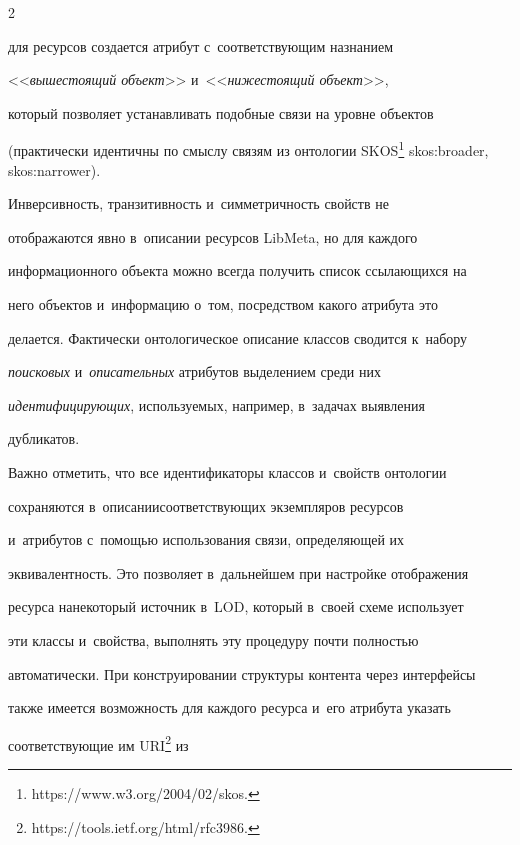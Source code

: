 \begin{multicols}{2}
\begin{itemize}
для ресурсов создается атрибут с~соответствующим назнанием 

<<\textit{вышестоящий объект}>> и~<<\textit{нижестоящий объект}>>, 

кото\-рый позволяет устанавливать подобные связи на уровне объектов 

(практически идентичны по смыслу связям из онтологии SKOS\footnote{{\sf  

https://www.w3.org/2004/02/skos.}} skos:broader, skos:narrower).

\end{itemize}



    Инверсивность, транзитивность и~симметричность свойств не 

отображаются явно в~описании ресурсов LibMeta, но для каждого 

информационного объекта можно всегда получить список ссылающихся на 

него объектов и~информацию о~том, посредством какого атрибута это 

делается. Фактически онтологическое описание классов сводится к~набору 

\textit{поисковых} и~\textit{описательных} атрибутов выделением среди них 

\textit{идентифицирующих}, используемых, например, в~задачах выявления 

дубликатов.

    

    Важно отметить, что все идентификаторы классов и~свойств онтологии 

сохраняются в~описании\linebreak соответствующих экземпляров ресурсов 

и~атрибутов с~помощью использования связи, опре\-де\-ля\-ющей их 

эквивалентность. Это позволяет в~дальнейшем при настройке отображения 

ресурса на\linebreak некоторый источник в~LOD, который в~своей схеме использует 

эти классы и~свойства, выполнять эту процедуру почти полностью 

автоматически. При конструировании структуры контента через интерфейсы 

также имеется возможность для каждого ресурса и~его атрибута указать 

соответствующие им URI\footnote[2]{{\sf https://tools.ietf.org/html/rfc3986.}} из 


\end{multicols}
